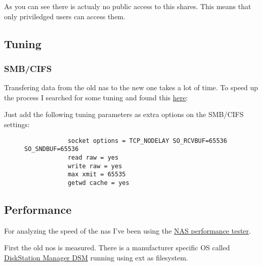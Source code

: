 

As you can see there is actualy no public access to this shares. This means
that only priviledged users can access them.

\subsection{Tuning}\label{sub:tuning}

\subsubsection{SMB/CIFS}

Transfering data from the old \gls{nas} to the new one takes a lot of time. To
speed up the process I searched for some tuning and found this
\href{https://techie-show.com/open-media-vault-smb-performance-quick-win/}{here}:


Just add the following tuning parameters as extra options on the SMB/CIFS settings:

\begin{figure}[H]
    \centering
    \begin{footnotesize}
        \begin{BVerbatim}
            socket options = TCP_NODELAY SO_RCVBUF=65536 SO_SNDBUF=65536
            read raw = yes
            write raw = yes
            max xmit = 65535
            getwd cache = yes
        \end{BVerbatim}
    \end{footnotesize}
\end{figure}

\subsection{Performance}

For analyzing the speed of the \gls{nas} I've been using the
\href{https://www.808.dk/?code-csharp-nas-performance}{NAS performance tester}.
\bigbreak

First the old \gls{nos} is measured. There is a manufacturer specific OS
called \href{https://www.synology.com/en-us/dsm}{DiskStation Manager DSM}
running using \gls{ext} as filesystem.

